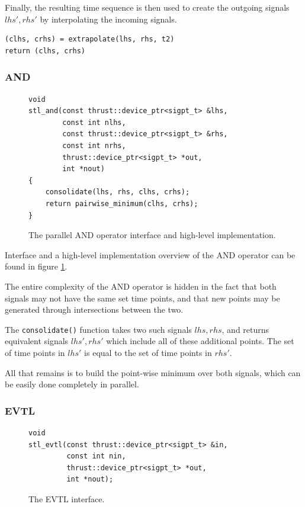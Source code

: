 \documentclass[a4paper,10pt]{article}
\begin{document}
Finally, the resulting time sequence is then used to create the outgoing signals
$lhs', rhs'$ by interpolating the incoming signals.

\begin{lstlisting}
(clhs, crhs) = extrapolate(lhs, rhs, t2)
return (clhs, crhs)
\end{lstlisting}

\subsubsection{AND}

\begin{figure}[H]
\begin{lstlisting}
void
stl_and(const thrust::device_ptr<sigpt_t> &lhs,
        const int nlhs,
        const thrust::device_ptr<sigpt_t> &rhs,
        const int nrhs,
        thrust::device_ptr<sigpt_t> *out,
        int *nout)
{
	consolidate(lhs, rhs, clhs, crhs);
	return pairwise_minimum(clhs, crhs);
}
\end{lstlisting}
\caption{
\label{fig:parallel_and}
The parallel AND operator interface and high-level implementation.}
\end{figure}

Interface and a high-level implementation overview of the AND operator can be found 
in figure \ref{fig:parallel_and}.

The entire complexity of the AND operator is hidden in the fact that
both signals may not have the same set time points, and that new points
may be generated through intersections between the two.

The \lstinline|consolidate()|
function takes two such signals $lhs, rhs$, and returns equivalent signals $lhs', rhs'$ which include
all of these additional points. The set of time points in $lhs'$ is equal to the set
of time points in $rhs'$.

All that remains is to build the point-wise minimum over both signals, which
can be easily done completely in parallel.

\subsubsection{EVTL}

\begin{figure}[H]
\begin{lstlisting}
void
stl_evtl(const thrust::device_ptr<sigpt_t> &in,
         const int nin,
         thrust::device_ptr<sigpt_t> *out,
         int *nout);
\end{lstlisting}
\caption{
\label{fig:parallel_evtl}
The EVTL interface.}
\end{figure}
\end{document}
